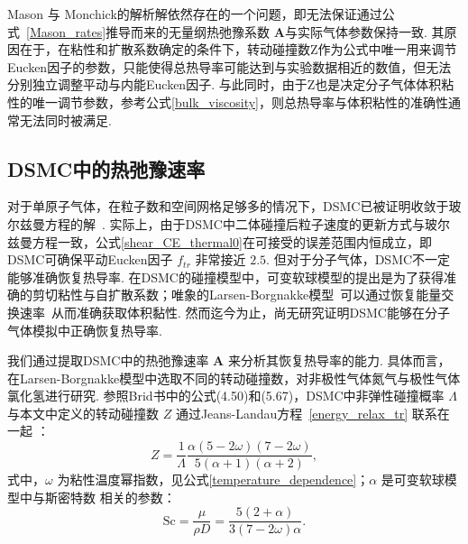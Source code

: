 

Mason 与 Monchick的解析解依然存在的一个问题，即无法保证通过公式~\eqref{Mason_rates}推导而来的无量纲热弛豫系数 $\bm{A}$与实际气体参数保持一致. 其原因在于，在粘性和扩散系数确定的条件下，转动碰撞数Z作为公式中唯一用来调节 Eucken因子的参数，只能使得总热导率可能达到与实验数据相近的数值，但无法分别独立调整平动与内能Eucken因子. 与此同时，由于Z也是决定分子气体体积粘性的唯一调节参数，参考公式\eqref{bulk_viscosity}，则总热导率与体积粘性的准确性通常无法同时被满足. 




\subsection{DSMC中的热弛豫速率}\label{thermal_exp_DSMC}


对于单原子气体，在粒子数和空间网格足够多的情况下，DSMC已被证明收敛于玻尔兹曼方程的解~\cite{wagner_consist}. 实际上，由于DSMC中二体碰撞后粒子速度的更新方式与玻尔兹曼方程一致，公式\eqref{shear_CE_thermal0}在可接受的误差范围内恒成立，即 DSMC可确保平动Eucken因子 $f_{tr}$ 非常接近 $2.5$. 但对于分子气体，DSMC不一定能够准确恢复热导率. 在DSMC的碰撞模型中，可变软球模型的提出是为了获得准确的剪切粘性与自扩散系数；唯象的Larsen-Borgnakke模型~\cite{Borgnakke1975}可以通过恢复能量交换速率~\cite{Boyd1991PoFA,Haas1994,Lavin2002PoF}从而准确获取体积黏性. 然而迄今为止，尚无研究证明DSMC能够在分子气体模拟中正确恢复热导率. 







我们通过提取DSMC中的热弛豫速率 $\bm{A}$ 来分析其恢复热导率的能力. 具体而言，在Larsen-Borgnakke模型中选取不同的转动碰撞数，对非极性气体氮气与极性气体氯化氢进行研究. 参照Brid书中的公式(4.50)和(5.67)，DSMC中非弹性碰撞概率 $\Lambda$ 与本文中定义的转动碰撞数 $Z$ 通过Jeans-Landau方程~\eqref{energy_relax_tr} 联系在一起 \cite{Bird1994}：
\begin{equation}\label{Z_DSMC}
Z=\frac{1}{\Lambda}\frac{\alpha(5-2\omega)(7-2\omega)}{5(\alpha+1)(\alpha+2)},
\end{equation} 
式中，$\omega$ 为粘性温度幂指数，见公式\eqref{temperature_dependence}；$\alpha$ 是可变软球模型中与斯密特数 相关的参数：
\begin{equation}
\text{Sc}=\frac{\mu}{\rho{D}}=\frac{5(2+\alpha)}{3(7-2\omega)\alpha}.
\end{equation} 


